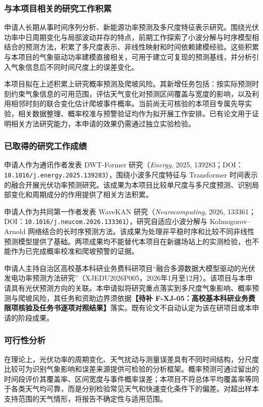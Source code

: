 \justifying
\NSFCBodyText

\subsubsection{与本项目相关的研究工作积累}
申请人长期从事时间序列分析、新能源功率预测及多尺度特征表示研究。围绕光伏功率中日周期变化与局部波动并存的特点，前期工作探索了小波分解与时序模型相结合的预测方法，积累了多尺度表示、非线性映射和时间依赖建模经验。这些积累与本项目的气象驱动功率建模直接相关，可用于建立可复现的预测基线，并分析引入气象信息后不同时间尺度上的误差变化。

本项目拟在上述积累上研究概率预测及爬坡风险。其新增任务包括：按实际预测时刻约束气象信息的可用范围，评估天气变化对预测区间覆盖与宽度的影响，以及利用相邻时刻的联合变化估计爬坡事件概率。当前尚无可核验的本项目专属先导实验，相关数据整理、概率校准与预警验证均作为拟开展工作安排。已有论文用于证明相关方法研究能力，本申请的效果仍需通过独立实验检验。

\subsubsection{已取得的研究工作成绩}
申请人作为通讯作者发表 DWT-Former 研究（\textit{Energy}, 2025, 139283；DOI：\nolinkurl{10.1016/j.energy.2025.139283}）\cite{sun2025dwt}，围绕小波多尺度特征与 Transformer 时间表示的融合开展光伏功率预测研究。该成果为本项目比较单尺度与多尺度预测、识别局部变化和周期成分的作用提供了相关方法积累。

申请人作为共同第一作者发表 WaveKAN 研究（\textit{Neurocomputing}, 2026, 133361；DOI：\nolinkurl{10.1016/j.neucom.2026.133361}）\cite{liu2026wavekan}，研究自适应小波分解与 Kolmogorov--Arnold 网络结合的长时序预测方法。该成果为处理非平稳时序和比较不同非线性预测模型提供了基础。两项成果均不能替代本项目在新疆场站上的实测检验，也不能作为已完成概率校准和爬坡预警的证据。

申请人主持自治区高校基本科研业务费科研项目“融合多源数据大模型驱动的光伏发电功率预测方法研究”（XJEDU2026P005，2026年1月至12月）。该项目与本申请具有光伏预测方向的关联。本申请拟将研究重点落实到多尺度气象影响、概率预测与爬坡风险，其任务和资助边界须依据\textbf{【待补 F-XJ-05：高校基本科研业务费限项核验及任务书逐项对照结果】}落实。既有论文不自动认定为该在研项目或本申请的阶段成果。

\subsubsection{可行性分析}
在理论上，光伏功率的周期变化、天气扰动与测量误差具有不同时间结构，分尺度比较可为识别气象影响和误差来源提供可检验的分析框架。概率预测可通过留出的时间段评价其覆盖率、区间宽度与事件概率误差；本项目不将总体平均覆盖率等同于各类天气均可靠，而是分别检验常见天气和快速变化条件下的偏差。对超出样本支持范围的天气情形，将报告不确定性与适用范围。

